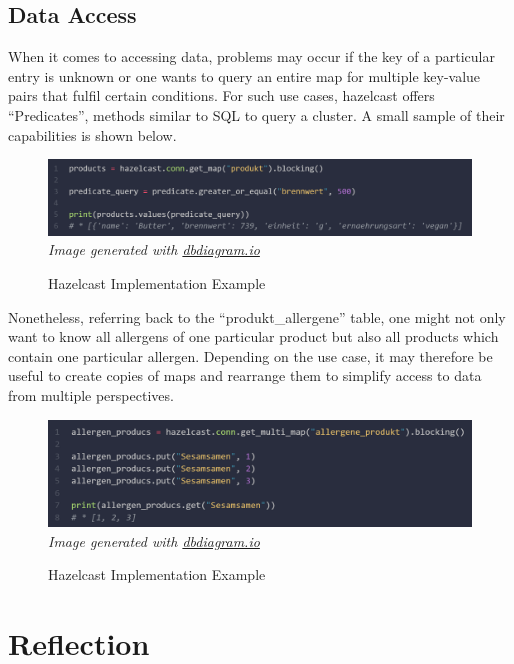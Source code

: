 \subsection{Data Access} \label{subsec:dataAccessHazelcast}

When it comes to accessing data, problems may occur if the key of a particular entry is unknown or one wants 
to query an entire map for multiple key-value pairs that fulfil certain conditions. For such use cases, 
hazelcast offers \enquote{Predicates}, methods similar to SQL to query a cluster. \textcite{Hazelcast.Predicates} 
A small sample of their capabilities is shown below. 

\begin{figure}[H]
    \caption{Hazelcast Implementation Example} \label{fig:hazelcast.predicates}
    \includegraphics[width=1\textwidth]{images/hazelcast.predicates.png}
    \small\textit{Image generated with \href{https://dbdiagram.io/}{dbdiagram.io}}
\end{figure}

Nonetheless, referring back to the \enquote{produkt\_allergene} table, one might not only want to know all 
allergens of one particular product but also all products which contain one particular allergen. 
Depending on the use case, it may therefore be useful to create copies of maps and rearrange them 
to simplify access to data from multiple perspectives. 

\begin{figure}[H]
    \caption{Hazelcast Implementation Example} \label{fig:hazelcast.product_allergens.2.multimap}
    \includegraphics[width=1\textwidth]{images/hazelcast.product_allergens.multimap.2.png}
    \small\textit{Image generated with \href{https://dbdiagram.io/}{dbdiagram.io}}
\end{figure}


\section{Reflection} \label{sec:reflectionHazelcast}



